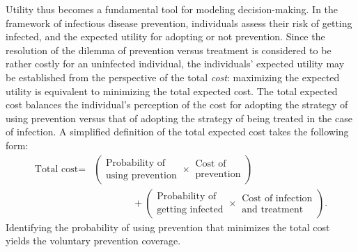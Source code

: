 Utility thus becomes a fundamental tool for modeling decision-making. In the framework of infectious disease prevention, individuals assess their risk of getting infected, and the expected utility for adopting or not prevention. Since the resolution of the dilemma of prevention versus treatment is considered to be rather costly for an uninfected individual, the individuals' expected utility may be established from the perspective of the total {\it cost}: maximizing the expected utility is equivalent to minimizing the total expected cost. The total expected cost balances the individual's perception of the cost for adopting the strategy of using prevention versus that of adopting the strategy of being treated in the case of infection. A simplified definition of the total expected cost takes the following form:
\begin{align*}
	\text{Total cost} = & \left( 
		\begin{array}{c}
		\text{Probability of}\\
		\text{using prevention}
		\end{array}
	 	\times 
		\begin{array}{c}
		\text{Cost of}\\
		\text{prevention}
		\end{array}
		\right)\\
	& \qquad \qquad + \left( 
		\begin{array}{c}
		\text{Probability of}\\
		\text{getting infected}
		\end{array}
	 	\times 
		\begin{array}{c}
		\text{Cost of infection}\\
		\text{and treatment}
		\end{array}
		\right).
\end{align*}
%
Identifying the probability of using prevention that minimizes the total cost yields the voluntary prevention coverage.

